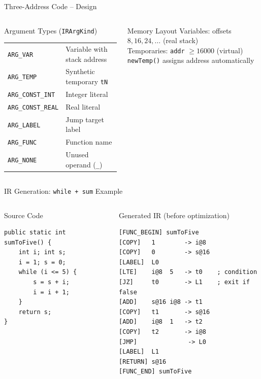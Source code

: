 \documentclass[aspectratio=169,11pt]{beamer}
\begin{document}
\begin{frame}{Three-Address Code -- Design}
\begin{columns}[t]
  \begin{block}{Argument Types (\texttt{IRArgKind})}
    \small
    \begin{tabular}{ll}
      \texttt{ARG\_VAR}        & Variable with stack address \\
      \texttt{ARG\_TEMP}       & Synthetic temporary \texttt{tN} \\
      \texttt{ARG\_CONST\_INT} & Integer literal \\
      \texttt{ARG\_CONST\_REAL}& Real literal \\
      \texttt{ARG\_LABEL}      & Jump target label \\
      \texttt{ARG\_FUNC}       & Function name \\
      \texttt{ARG\_NONE}       & Unused operand (\texttt{\_}) \\
    \end{tabular}
  \end{block}
  \begin{exampleblock}{Memory Layout}
    \small
    Variables: offsets $8, 16, 24,\ldots$ (real stack)\\
    Temporaries: \texttt{addr} $\geq 16000$ (virtual)\\
    \texttt{newTemp()} assigns address automatically
  \end{exampleblock}
\end{columns}
\end{frame}

\begin{frame}[fragile]{IR Generation: \texttt{while + sum} Example}
\begin{columns}[t]
  \begin{block}{Source Code}
\begin{lstlisting}[style=javaslide,numbers=none]
public static int sumToFive() {
    int i; int s;
    i = 1; s = 0;
    while (i <= 5) {
        s = s + i;
        i = i + 1;
    }
    return s;
}
\end{lstlisting}
  \end{block}

  \begin{exampleblock}{Generated IR (before optimization)}
\begin{lstlisting}[style=asmslide]
[FUNC_BEGIN] sumToFive
[COPY]   1        -> i@8
[COPY]   0        -> s@16
[LABEL]  L0
[LTE]    i@8  5   -> t0    ; condition
[JZ]     t0       -> L1    ; exit if false
[ADD]    s@16 i@8 -> t1
[COPY]   t1       -> s@16
[ADD]    i@8  1   -> t2
[COPY]   t2       -> i@8
[JMP]              -> L0
[LABEL]  L1
[RETURN] s@16
[FUNC_END] sumToFive
\end{lstlisting}
  \end{exampleblock}
\end{columns}
\end{frame}
\end{document}
